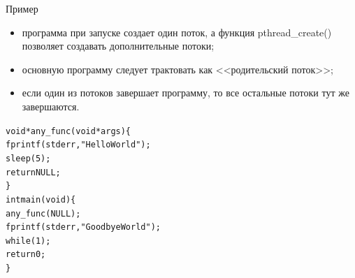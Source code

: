 \documentclass{beamer}
\begin{document}
\begin{frame}[fragile]{Пример}
\begin{itemize}
\item программа при запуске создает один поток, а функция pthread\_create() позволяет создавать дополнительные потоки;
\item основную программу следует трактовать как <<родительский поток>>;
\item если один из потоков завершает программу, то все остальные потоки тут же завершаются.
\end{itemize}
\begin{alltt}
void * any_func (void * args) \{
  fprintf (stderr, "Hello World");
  sleep (5);
  return NULL;
\}
int main (void)\{
  any_func (NULL);
  fprintf (stderr, "Goodbye World");
  while (1);
  return 0;
\}
\end{alltt}
\end{frame}

\end{document}
